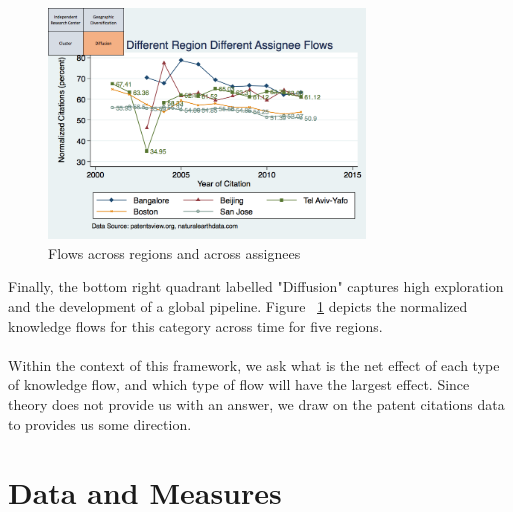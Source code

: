 \documentclass[12pt]{article}
\begin{document}
\begin{figure}[h!]
\begin{centering}
  \includegraphics[width=0.75\textwidth]{SMSDiffRegionDiffAssigneeFlows}
  \caption{Flows across regions and across assignees}
  \label{fig:SMSDiffRegionDiffAssigneeFlows}
\end{centering}
\end{figure}

Finally, the bottom right quadrant labelled "Diffusion" captures high exploration and the development of a global pipeline. Figure ~\ref{fig:SMSDiffRegionDiffAssigneeFlows} depicts the normalized knowledge flows for this category across time for five regions.
\\\\
Within the context of this framework, we ask what is the net effect of each type of knowledge flow, and which type of flow will have the largest effect. Since theory does not provide us with an answer, we draw on the patent citations data to provides us some direction. 


\section*{Data and Measures}
\end{document}
